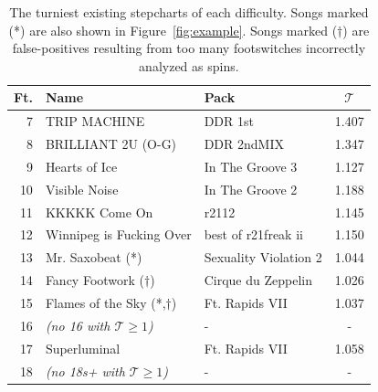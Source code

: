 \documentclass[10pt]{sigplanconf}
\begin{document}
\begin{table}[t]
	\begin{center}
		\small
	\begin{tabular}{r|l|l|c}
		Ft. & Name & Pack & $\mathcal{T}$ \\
		\hline
		7 & TRIP MACHINE & DDR 1st & 1.407 \\
		8 & BRILLIANT 2U (O-G) & DDR 2ndMIX & 1.347 \\
		9 & Hearts of Ice & In The Groove 3 & 1.127 \\
		10 & Visible Noise & In The Groove 2 & 1.188 \\
		11 & KKKKK Come On & r2112 & 1.145 \\
		12 & Winnipeg is Fucking Over & best of r21freak ii & 1.150 \\
		13 & Mr. Saxobeat (*) & Sexuality Violation 2 & 1.044 \\
		14 & Fancy Footwork ($\dagger$) & Cirque du Zeppelin & 1.026 \\
		15 & Flames of the Sky (*,$\dagger$) & Ft. Rapids VII &  1.037 \\
		16 & {\em (no 16 with $\mathcal{T}\ge 1$)} & - & - \\
		17 & Superluminal & Ft. Rapids VII & 1.058 \\
		18 & {\em (no 18s+ with $\mathcal{T}\ge 1$)} & - & - \\
	\end{tabular}
	\end{center}
	\caption{The turniest existing stepcharts of each difficulty. Songs marked (*) are also shown in Figure~\ref{fig:example}. Songs marked ($\dagger$) are false-positives resulting from too many footswitches incorrectly analyzed as spins.}
	\label{tab:feets}
\end{table}
\end{document}
